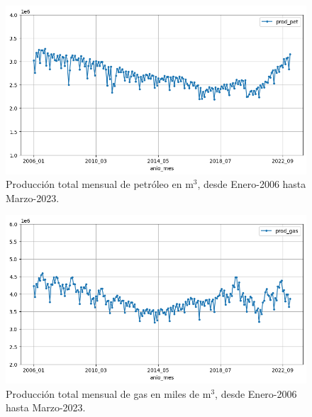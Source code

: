 \documentclass[a4paper]{article}
\begin{document}
\begin{figure}[h]
	\centering
	\includegraphics[trim={0cm 0cm 0cm 0cm},clip,width=\textwidth]{prod_pet.png}
	\caption{Producción total mensual de petróleo en m$^3$, desde Enero-2006 hasta Marzo-2023.}
	\label{fig:prodPet}
\end{figure}

\begin{figure}[H]
	\centering
	\includegraphics[trim={0cm 0cm 0cm 0cm},clip,width=\textwidth]{prod_gas.png}
	\caption{Producción total mensual de gas en miles de m$^3$, desde Enero-2006 hasta Marzo-2023.}
	\label{fig:prodGas}
\end{figure}
\end{document}
